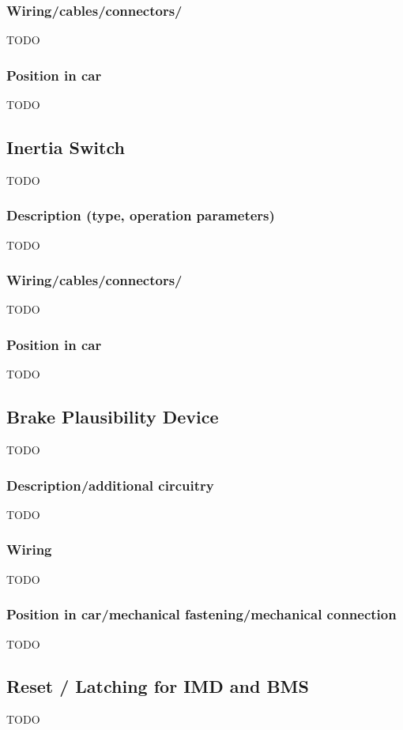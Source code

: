 \documentclass{article}
\begin{document}
\subsubsection{Wiring/cables/connectors/}
TODO

\subsubsection{Position in car}
TODO

\subsection{Inertia Switch}
TODO

\subsubsection{Description (type, operation parameters)}
TODO

\subsubsection{Wiring/cables/connectors/}
TODO

\subsubsection{Position in car}
TODO

\subsection{Brake Plausibility Device}
TODO

\subsubsection{Description/additional circuitry}
TODO

\subsubsection{Wiring}
TODO

\subsubsection{Position in car/mechanical fastening/mechanical connection}
TODO

\subsection{Reset / Latching for IMD and BMS}
TODO
\end{document}
